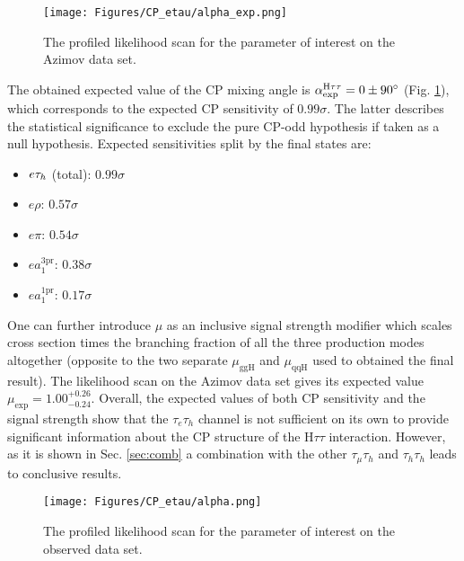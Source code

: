 \begin{figure}[h!]
    \centering
    \texttt{[image: Figures/CP\_etau/alpha\_exp.png]}
    \caption{The profiled likelihood scan for the \mixa parameter of interest on the Azimov data set.}
    \label{fig:mixa_exp}
\end{figure}

The obtained expected value of the CP mixing angle is $\alpha^{\text{H}\tau\tau}_\text{exp} = 0 \pm 90^\circ$ (Fig. \ref{fig:mixa_exp}), which corresponds to the expected CP sensitivity of $0.99 \sigma$. The latter describes the statistical significance to exclude the pure CP-odd hypothesis if taken as a null hypothesis. Expected sensitivities split by the final states are:
\begin{itemize}
    \item $e\tau_h$ (total): $0.99\sigma$ 
    \item $e\rho$: $0.57\sigma$ 
    \item $e\pi$: $0.54\sigma$ 
    \item $ea_1^\text{3pr}$: $0.38\sigma$ 
    \item $ea_1^\text{1pr}$: $0.17\sigma$ 
\end{itemize}


One can further introduce $\mu$ as an inclusive signal strength modifier which scales cross section times the \htt branching fraction of all the three production modes altogether (opposite to the two separate $\mu_\text{ggH}$ and $\mu_\text{qqH}$ used to obtained the final result). The likelihood scan on the Azimov data set gives its expected value $\mu_\text{exp} = 1.00^{+0.26}_{-0.24}$. Overall, the expected values of both CP sensitivity and the signal strength show that the $\tau_e\tau_h$ channel is not sufficient on its own to provide significant information about the CP structure of the $\text{H}\tau\tau$ interaction. However, as it is shown in Sec. \ref{sec:comb} a combination with the other $\tau_\mu\tau_h$ and $\tau_h\tau_h$ leads to conclusive results.

\begin{figure}[h!]
    \centering
    \texttt{[image: Figures/CP\_etau/alpha.png]}
    \caption{The profiled likelihood scan for the \mixa parameter of interest on the observed data set.}
    \label{fig:mixa_obs}
\end{figure}

